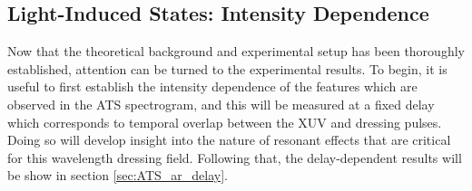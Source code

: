 \subsection{Light-Induced States: Intensity Dependence}
\label{sec:ATS_ar_LIS}

Now that the theoretical background and experimental setup has been thoroughly established, attention can be turned to the experimental results.  To begin, it is useful to first establish the intensity dependence of the features which are observed in the ATS spectrogram, and this will be measured at a fixed delay which corresponds to temporal overlap between the XUV and dressing pulses.  Doing so will develop insight into the nature of resonant effects that are critical for this wavelength dressing field. Following that, the delay-dependent results will be show in section \ref{sec:ATS_ar_delay}. 

